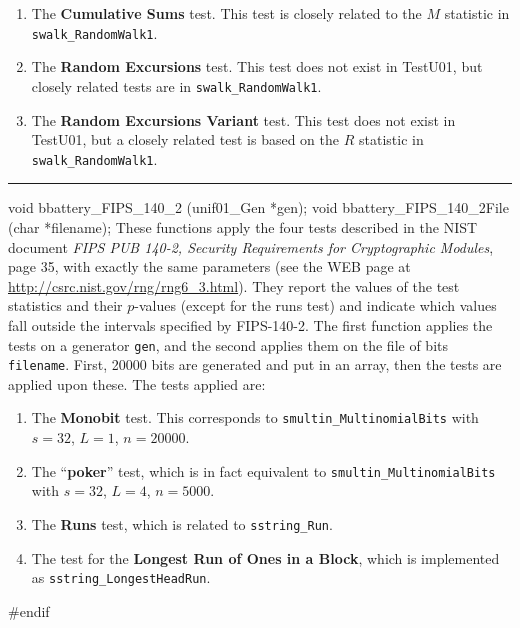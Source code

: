\begin{enumerate}
\item The {\bf Cumulative Sums} test. This test is  closely related to the $M$
 statistic in  {\tt swalk\_RandomWalk1}.

\item The {\bf Random Excursions} test. This test does not
exist in TestU01, but closely related tests are in
  {\tt swalk\_RandomWalk1}.

\item The {\bf Random Excursions Variant} test.  This test does not
exist in TestU01, but a closely related test is based on the $R$ statistic in
  {\tt swalk\_RandomWalk1}.

\end{enumerate}


\bigskip
\hrule
\code


void bbattery_FIPS_140_2 (unif01_Gen *gen);
void bbattery_FIPS_140_2File (char *filename);
\endcode
\tab
{}%
 These functions apply the four tests described in the NIST document
 {\sl FIPS PUB 140-2, Security Requirements for Cryptographic Modules},
 page 35, with exactly the same parameters (see the WEB page at
  \url{http://csrc.nist.gov/rng/rng6_3.html}).  They report the values
 of the test statistics and their $p$-values (except for the runs test)
 and indicate which values fall outside the intervals specified by
 FIPS-140-2. The first function applies the tests on a generator {\tt gen},
 and the second applies them on the file of bits {\tt filename}. First,
 20000 bits are generated and put in an array, then the tests are applied
 upon these. The tests applied are:
\endtab

\begin{enumerate}
\item The {\bf Monobit} test. This corresponds to
 {\tt smultin\_MultinomialBits} with $s=32$, $L=1$, $n=20000$.

\item The ``{\bf poker}'' test, which is in fact equivalent to
 {\tt smultin\_MultinomialBits} with $s=32$, $L=4$, $n=5000$.

\item The {\bf Runs} test, which is related to {\tt sstring\_Run}.

\item The test for the {\bf Longest Run of Ones in a Block},
 which is implemented as {\tt sstring\_LongestHeadRun}.
\end{enumerate}


\code
\hide
#endif
\endhide
\endcode
